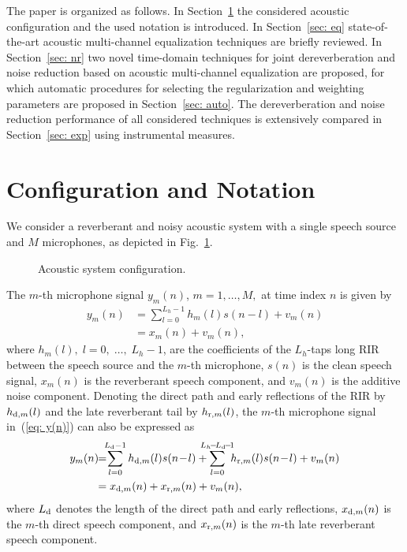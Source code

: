 \documentclass[10pt]{IEEEtran}
\begin{document}
The paper is organized as follows. 
In Section~\ref{sec: conf} the considered acoustic configuration and the used notation is introduced.
In Section~\ref{sec: eq} state-of-the-art acoustic multi-channel equalization techniques are briefly reviewed. 
In Section~\ref{sec: nr} two novel time-domain techniques for joint dereverberation and noise reduction based on acoustic multi-channel equalization are proposed, for which automatic procedures for selecting the regularization and weighting parameters are proposed in Section~\ref{sec: auto}.
The dereverberation and noise reduction performance of all considered techniques is extensively compared in Section~\ref{sec: exp} using instrumental measures.

\section{Configuration and Notation}
\label{sec: conf}
We consider a reverberant and noisy acoustic system with a single speech source and $M$ microphones, as depicted in Fig.~\ref{fig: conf}.
\begin{figure}[b!]
  \centering
  
  \caption{Acoustic system configuration.}
  \label{fig: conf}
\end{figure}
The $m$-th microphone signal $y_m(n)$, $m = 1, \ldots, M,$ at time index $n$ is given by
\begin{align}
\label{eq: y(n)}
y_m(n) & = \sum_{l=0}^{L_h-1} h_m(l)  s(n-l) + v_m(n) \\
& = x_m(n) + v_m(n), 
\end{align}
where $h_m(l), \; l = 0, \; \ldots, \; L_h-1$, are the coefficients of the $L_h$-taps long RIR between the speech source and the $m$-th microphone, $s(n)$ is the clean speech signal, $x_{m}(n)$ is the reverberant speech component, and $v_{m}(n)$ is the additive noise component. 
Denoting the direct path and early reflections of the RIR by $h_{{\rm{d}},m}(l)$ and the late reverberant tail by $h_{{\rm{r}},m}(l)$, the $m$-th microphone signal in~(\ref{eq: y(n)}) can also be expressed as
\begin{align}
y_m(n) & \!\!= \!\!\!\sum_{l=0}^{L_{\rm{d}}-1}h_{{\rm{d}},m}(l) s(n\!-\!l) + \!\!\!\!\!\sum_{l=0}^{L_h\!-\!L_{\rm{d}}\!-\!1}\!\!\!h_{{\rm{r}},m}(l) s(n\!-\!l) + v_m(n) \nonumber \\ 
\label{eq: ysp}
& \!\! = x_{{\rm{d}},m}(n) + x_{{\rm{r}},m}(n) + v_m(n),
\end{align}
where $L_{\rm{d}}$ denotes the length of the direct path and early reflections, $x_{{\rm{d}},m}(n)$ is the $m$-th direct speech component, and $x_{{\rm{r}},m}(n)$ is the $m$-th late reverberant speech component.
\end{document}
